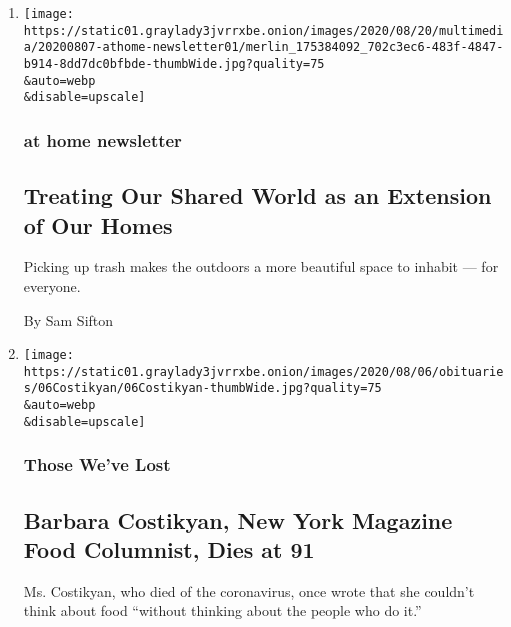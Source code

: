 \begin{enumerate}
\def\labelenumi{\arabic{enumi}.}
\item
  \href{/2020/08/07/at-home/newsletter.html}{}

  \texttt{[image: https://static01.graylady3jvrrxbe.onion/images/2020/08/20/multimedia/20200807-athome-newsletter01/merlin\_175384092\_702c3ec6-483f-4847-b914-8dd7dc0bfbde-thumbWide.jpg?quality=75\\\&auto=webp\\\&disable=upscale]}

  \hypertarget{at-home-newsletter}{%
  \subsubsection{at home newsletter}\label{at-home-newsletter}}

  \hypertarget{treating-our-shared-world-as-an-extension-of-our-homes}{%
  \subsection{Treating Our Shared World as an Extension of Our
  Homes}\label{treating-our-shared-world-as-an-extension-of-our-homes}}

  Picking up trash makes the outdoors a more beautiful space to inhabit
  --- for everyone.

  By Sam Sifton
\item
  \href{/2020/08/07/obituaries/barbara-costikyan-dead-coronavirus.html}{}

  \texttt{[image: https://static01.graylady3jvrrxbe.onion/images/2020/08/06/obituaries/06Costikyan/06Costikyan-thumbWide.jpg?quality=75\\\&auto=webp\\\&disable=upscale]}

  \hypertarget{those-weve-lost}{%
  \subsubsection{Those We've Lost}\label{those-weve-lost}}

  \hypertarget{barbara-costikyan-new-york-magazine-food-columnist-dies-at-91}{%
  \subsection{Barbara Costikyan, New York Magazine Food Columnist, Dies
  at
  91}\label{barbara-costikyan-new-york-magazine-food-columnist-dies-at-91}}

  Ms. Costikyan, who died of the coronavirus, once wrote that she
  couldn't think about food ``without thinking about the people who do
  it.''


\end{enumerate}
